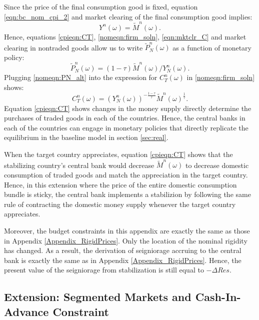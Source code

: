 Since the price of the final consumption good is fixed, equation
\eqref{eqn:bc_nom_cpi_2} and market clearing of the final consumption
good implies:
\begin{equation}
  Y^n(\omega) = \tilde M^n(\omega).
  \label{eqn:mktclr_C}
\end{equation}
Hence, equations \eqref{cpieqn:CT}, \eqref{nomeqn:firm_soln},
\eqref{eqn:mktclr_C} and market clearing in nontraded goods allow us
to write $\tilde{P}^n_N(\omega)$ as a function of monetary policy:
\begin{equation}
  \tilde{P}^n_N(\omega) = (1 - \tau)
  \tilde{M}^n(\omega) / Y^n_N(\omega).
  \label{nomeqn:PN_alt}
\end{equation}
Plugging \eqref{nomeqn:PN_alt} into the expression for $C^n_T(\omega)$
in \eqref{nomeqn:firm_soln} shows:
\begin{equation}
  C^n_T(\omega)
  = \left( Y^n_N(\omega) \right)^{- \frac{1 - \tau}{\tau}}
  \tilde{M}^n(\omega)^{\frac{1}{\tau}}.
  \label{cpieqn:CT}
\end{equation}
Equation \eqref{cpieqn:CT} shows changes in the money supply directly
determine the purchases of traded goods in each of the countries.
Hence, the central banks in each of the countries can engage in
monetary policies that directly replicate the equilibrium in the
baseline model in section \ref{sec:real}.

When the target country appreciates, equation \eqref{cpieqn:CT} shows
that the stabilizing country's central bank would decrease
$\tilde M^n(\omega)$ to decrease domestic consumption of traded goods
and match the appreciation in the target country. Hence, in this
extension where the price of the entire domestic consumption bundle is
sticky, the central bank implements a stabilizion by following the
same rule of contracting the domestic money supply whenever the target
country appreciates.

Moreover, the budget constraints in this appendix are exactly the same
as those in Appendix \ref{Appendix_RigidPrices}. Only the location of
the nominal rigidity has changed. As a result, the derivation of
seigniorage accruing to the central bank is exactly the same as in
Appendix \ref{Appendix_RigidPrices}. Hence, the present value of the
seigniorage from stabilization is still equal to $-\Delta Res$.


\subsection{Extension: Segmented Markets and Cash-In-Advance
  Constraint\label{Appendix_CIA}}

